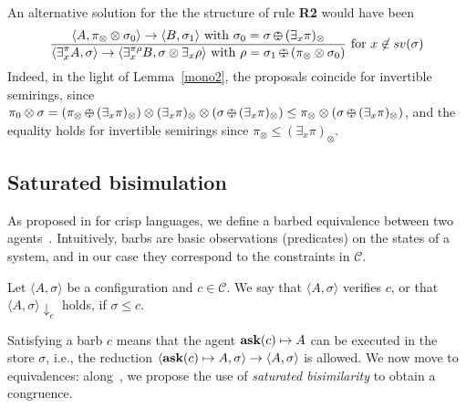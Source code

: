 \documentclass{llncs}
\newcommand{\ask}{{\bf ask}}
\def\odiv{\, {\ominus\hspace{-7.7pt} \div} \,}
\begin{document}
\begin{remark}
An alternative solution for the the structure of rule \mbox{\bf R2} would have been
    $$\frac {\displaystyle \langle A, \pi_\otimes \otimes \sigma_0 \rangle
    \to \langle B, \sigma_1 \rangle \text{ with } \sigma_0 = \sigma \odiv (\exists_x \pi)_\otimes}
    {\displaystyle\langle \exists^{\pi}_x A,\sigma\rangle \to \langle 
    \exists^{\pi \rho}_x B, \sigma \otimes \exists_x \rho
    \rangle \text{ with } \rho = \sigma_1 \odiv (\pi_\otimes \otimes \sigma_0)} \text{ for } x \not \in sv(\sigma)$$
Indeed, in the light of Lemma~\ref{mono2}, the proposals coincide for 
invertible semirings, since 
$\pi_0 \otimes \sigma
=
(\pi_\otimes \odiv (\exists_x \pi)_\otimes) \otimes (\exists_x \pi)_\otimes \otimes (\sigma \odiv (\exists_x \pi)_\otimes)
\leq
\pi_\otimes \otimes (\sigma \odiv (\exists_x \pi)_\otimes)$,
and the equality holds for invertible semirings
since $\pi_\otimes \leq (\exists_x \pi)_\otimes$.
\end{remark}




\subsection{Saturated bisimulation}\label{sec:saturated}
As proposed in \cite{pippo} for crisp languages, we define a barbed equivalence between two agents~\cite{barbed}.  
%
Intuitively, barbs are basic observations (predicates) on the states of a system, and in our case they correspond 
to the constraints in $\mathcal{C}$.

\begin{definition} [Barbs]
Let $\langle A, \sigma \rangle$ be a configuration and $c \in \mathcal{C}$. We say that $\langle A, \sigma \rangle$ verifies $c$, or that $\langle A, \sigma \rangle \downarrow_c$ holds, if  $\sigma \leq c$.
\end{definition}

Satisfying a barb $c$ means that the agent $\textit{\ask}(c) \mapsto A$ can be executed in the store $\sigma$,
i.e., the reduction $\langle \textit{\ask}(c) \mapsto A, \sigma \rangle \to \langle A, \sigma \rangle$ is allowed.
%
We now move to equivalences: %
along~\cite{pippo},
we propose the use of \emph{saturated bisimilarity}
to obtain a congruence.
%
\end{document}
